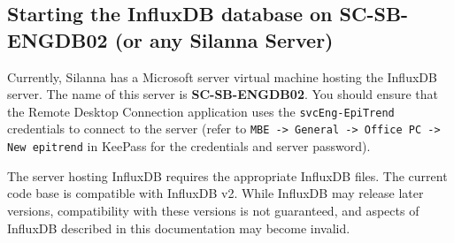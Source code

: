 \documentclass{article}
\begin{document}
\subsection{Starting the InfluxDB database on SC-SB-ENGDB02 (or any Silanna Server)}
\label{sec:Starting_the_InfluxDB_database_on_SC_SB}
Currently, Silanna has a Microsoft server virtual machine hosting the InfluxDB server. The name of this server is \textbf{SC-SB-ENGDB02}. You should ensure that the Remote Desktop  Connection application uses the \texttt{svcEng-EpiTrend} credentials to connect to the server (refer to \texttt{MBE -> General -> Office PC -> New epitrend} in KeePass for the credentials and server password).

\vspace{5pt}
\noindent
The server hosting InfluxDB requires the appropriate InfluxDB files. The current code base is compatible with InfluxDB v2. While InfluxDB may release later versions, compatibility with these versions is not guaranteed, and aspects of InfluxDB described in this documentation may become invalid.
\end{document}
